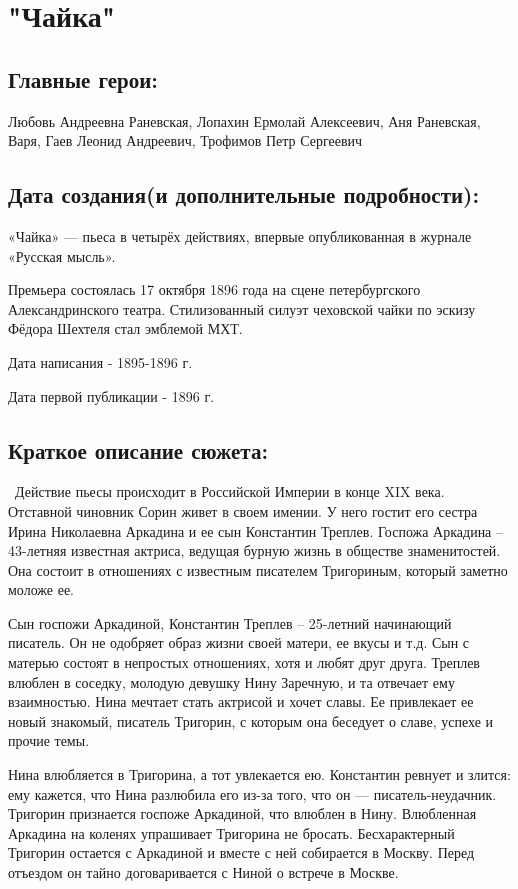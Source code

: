 \documentclass[a4paper,12pt]{article}
\begin{document}
	\section{"Чайка"}
	\subsection{Главные герои: }
	Любовь Андреевна Раневская, Лопахин Ермолай Алексеевич, Аня Раневская, Варя, Гаев Леонид Андреевич, Трофимов Петр Сергеевич
	\subsection{Дата создания(и дополнительные подробности): }
	«Чайка» — пьеса в четырёх действиях, впервые опубликованная в журнале «Русская мысль».
	
	\noindent
	Премьера состоялась 17 октября 1896 года на сцене петербургского Александринского театра. Стилизованный силуэт чеховской чайки по эскизу Фёдора Шехтеля стал эмблемой МХТ.
	
	\noindent
	Дата написания - 1895-1896 г.
	
	\noindent
	Дата первой публикации - 1896 г.
	
	\subsection{Краткое описание сюжета: }
	\quad \, Действие пьесы происходит в Российской Империи в конце XIX века. Отставной чиновник Сорин живет в своем имении. У него гостит его сестра Ирина Николаевна Аркадина и ее сын Константин Треплев. Госпожа Аркадина – 43-летняя известная актриса, ведущая бурную жизнь в обществе знаменитостей. Она состоит в отношениях с известным писателем Тригориным, который заметно моложе ее.
	
	Сын госпожи Аркадиной, Константин Треплев – 25-летний начинающий писатель. Он не одобряет образ жизни своей матери, ее вкусы и т.д. Сын с матерью состоят в непростых отношениях, хотя и любят друг друга. Треплев влюблен в соседку, молодую девушку Нину Заречную, и та отвечает ему взаимностью. Нина мечтает стать актрисой и хочет славы. Ее привлекает ее новый знакомый, писатель Тригорин, с которым она беседует о славе, успехе и прочие темы.
	
	Нина влюбляется в Тригорина, а тот увлекается ею. Константин ревнует и злится: ему кажется, что Нина разлюбила его из-за того, что он — писатель-неудачник. Тригорин признается госпоже Аркадиной, что влюблен в Нину. Влюбленная Аркадина на коленях упрашивает Тригорина не бросать. Бесхарактерный Тригорин остается с Аркадиной и вместе с ней собирается в Москву. Перед отъездом он тайно договаривается с Ниной о встрече в Москве.
	
\end{document}
